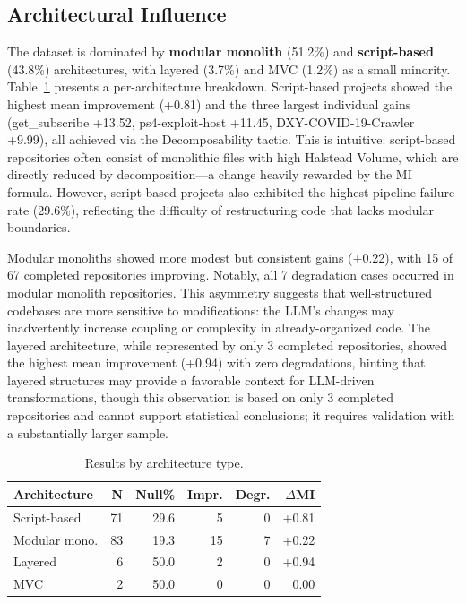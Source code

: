 \documentclass[sigconf,review,anonymous]{acmart}
\begin{document}
\subsection{Architectural Influence}
The dataset is dominated by \textbf{modular monolith} (51.2\%) and \textbf{script-based} (43.8\%) architectures, with layered (3.7\%) and MVC (1.2\%) as a small minority. Table~\ref{tab:arch} presents a per-architecture breakdown. Script-based projects showed the highest mean improvement (+0.81) and the three largest individual gains (get\_subscribe +13.52, ps4-exploit-host +11.45, DXY-COVID-19-Crawler +9.99), all achieved via the Decomposability tactic. This is intuitive: script-based repositories often consist of monolithic files with high Halstead Volume, which are directly reduced by decomposition---a change heavily rewarded by the MI formula. However, script-based projects also exhibited the highest pipeline failure rate (29.6\%), reflecting the difficulty of restructuring code that lacks modular boundaries.

Modular monoliths showed more modest but consistent gains (+0.22), with 15 of 67 completed repositories improving. Notably, all 7 degradation cases occurred in modular monolith repositories. This asymmetry suggests that well-structured codebases are more sensitive to modifications: the LLM's changes may inadvertently increase coupling or complexity in already-organized code. The layered architecture, while represented by only 3 completed repositories, showed the highest mean improvement (+0.94) with zero degradations, hinting that layered structures may provide a favorable context for LLM-driven transformations, though this observation is based on only 3 completed repositories and cannot support statistical conclusions; it requires validation with a substantially larger sample.

\begin{table}[htbp]
\caption{Results by architecture type.}
\label{tab:arch}
\centering
\small
\begin{tabular}{lrrrrr}
\toprule
\textbf{Architecture} & \textbf{N} & \textbf{Null\%} & \textbf{Impr.} & \textbf{Degr.} & \textbf{$\overline{\Delta}$MI} \\
\midrule
Script-based & 71 & 29.6 & 5 & 0 & +0.81 \\
Modular mono. & 83 & 19.3 & 15 & 7 & +0.22 \\
Layered & 6 & 50.0 & 2 & 0 & +0.94 \\
MVC & 2 & 50.0 & 0 & 0 & 0.00 \\
\bottomrule
\end{tabular}
\end{table}
\end{document}
